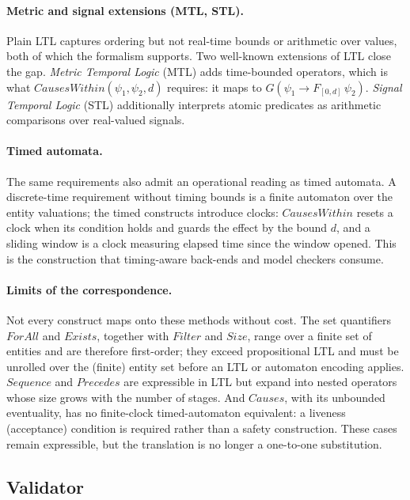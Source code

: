 \paragraph{Metric and signal extensions (MTL, STL).}
Plain LTL captures ordering but not real-time bounds or arithmetic over values, both of which the formalism supports. Two well-known extensions of LTL close the gap. \emph{Metric Temporal Logic} (MTL) adds time-bounded operators, which is what $\mathit{CausesWithin}(\psi_1, \psi_2, d)$ requires: it maps to $G(\psi_1 \rightarrow F_{[0,d]}\,\psi_2)$. \emph{Signal Temporal Logic} (STL) additionally interprets atomic predicates as arithmetic comparisons over real-valued signals.

\paragraph{Timed automata.}
The same requirements also admit an operational reading as timed automata. A discrete-time requirement without timing bounds is a finite automaton over the entity valuations; the timed constructs introduce clocks: $\mathit{CausesWithin}$ resets a clock when its condition holds and guards the effect by the bound $d$, and a sliding window is a clock measuring elapsed time since the window opened. This is the construction that timing-aware back-ends and model checkers consume.

\paragraph{Limits of the correspondence.}
Not every construct maps onto these methods without cost. The set quantifiers $\mathit{ForAll}$ and $\mathit{Exists}$, together with $\mathit{Filter}$ and $\mathit{Size}$, range over a finite set of entities and are therefore first-order; they exceed propositional LTL and must be unrolled over the (finite) entity set before an LTL or automaton encoding applies. $\mathit{Sequence}$ and $\mathit{Precedes}$ are expressible in LTL but expand into nested operators whose size grows with the number of stages. And $\mathit{Causes}$, with its unbounded eventuality, has no finite-clock timed-automaton equivalent: a liveness (acceptance) condition is required rather than a safety construction. These cases remain expressible, but the translation is no longer a one-to-one substitution.

\subsection{Validator}

